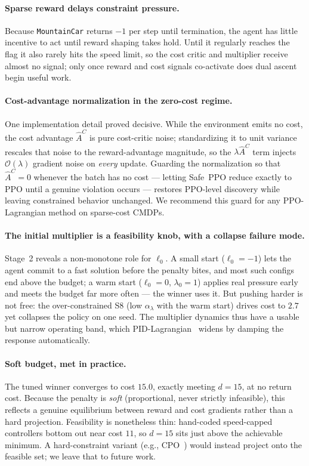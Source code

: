 \documentclass{article}
\begin{document}
\paragraph{Sparse reward delays constraint pressure.}
Because \texttt{MountainCar} returns $-1$ per step until termination, the agent has little incentive
to act until reward shaping takes hold. Until it regularly reaches the flag it also rarely hits the
speed limit, so the cost critic and multiplier receive almost no signal; only once reward and cost
signals co-activate does dual ascent begin useful work.

\paragraph{Cost-advantage normalization in the zero-cost regime.}
One implementation detail proved decisive. While the environment emits no cost, the cost advantage
$\hat{A}^C$ is pure cost-critic noise; standardizing it to unit variance rescales that noise to the
reward-advantage magnitude, so the $\lambda\hat{A}^C$ term injects $\mathcal{O}(\lambda)$ gradient
noise on \emph{every} update. Guarding the normalization so that $\hat{A}^C{=}0$ whenever the batch
has no cost --- letting Safe~PPO reduce exactly to PPO until a genuine violation occurs --- restores
PPO-level discovery while leaving constrained behavior unchanged. We recommend this guard for any
PPO-Lagrangian method on sparse-cost CMDPs.

\paragraph{The initial multiplier is a feasibility knob, with a collapse failure mode.}
Stage~2 reveals a non-monotone role for $\ell_0$. A small start ($\ell_0 = -1$) lets the agent
commit to a fast solution before the penalty bites, and most such configs end above the budget; a
warm start ($\ell_0 = 0$, $\lambda_0 = 1$) applies real pressure early and meets the budget far more
often --- the winner uses it. But pushing harder is not free: the over-constrained S8 (low
$\alpha_\lambda$ with the warm start) drives cost to $2.7$ yet collapses the policy on one seed. The
multiplier dynamics thus have a usable but narrow operating band, which
PID-Lagrangian~\citep{stooke2020responsive} widens by damping the response automatically.

\paragraph{Soft budget, met in practice.}
The tuned winner converges to cost $15.0$, exactly meeting $d{=}15$, at no return cost. Because the
penalty is \emph{soft} (proportional, never strictly infeasible), this reflects a genuine
equilibrium between reward and cost gradients rather than a hard projection. Feasibility is
nonetheless thin: hand-coded speed-capped controllers bottom out near cost $11$, so $d{=}15$ sits
just above the achievable minimum. A hard-constraint variant (e.g., CPO~\citep{achiam2017cpo})
would instead project onto the feasible set; we leave that to future work.
\end{document}
